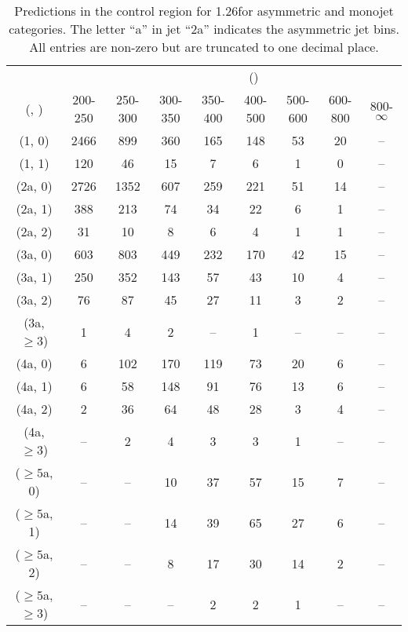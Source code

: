 \begin{table}[h!]
\tiny
\centering
\caption{Predictions in the \mj control region for 1.26\ifb for asymmetric and monojet categories. The letter ``a'' in jet \eg ``2a''  indicates the asymmetric jet bins. All entries are non-zero but are truncated to one decimal place.\label{tab:predsep_data_mu_asym}}
\begin{tabular}
{ccccccccc}
	\hline\hline
&	& \multicolumn{8}{c}{\scalht (\gev)} \\ 
	 (\njet,  \nb) & 200-250 & 250-300 & 300-350 & 350-400 & 400-500 & 500-600 & 600-800 & 800-$\infty$ \\ [0.8ex] 
\hline
	(1, 0) & 2466 & 899 & 360 & 165 & 148 & 53 & 20 & -- \\[0.5ex] 
	(1, 1) & 120 & 46 & 15 & 7 & 6 & 1 & 0 & -- \\[0.5ex] 
	(2a, 0) & 2726 & 1352 & 607 & 259 & 221 & 51 & 14 & -- \\[0.5ex] 
	(2a, 1) & 388 & 213 & 74 & 34 & 22 & 6 & 1 & -- \\[0.5ex] 
	(2a, 2) & 31 & 10 & 8 & 6 & 4 & 1 & 1 & -- \\[0.5ex] 
	(3a, 0) & 603 & 803 & 449 & 232 & 170 & 42 & 15 & -- \\[0.5ex] 
	(3a, 1) & 250 & 352 & 143 & 57 & 43 & 10 & 4 & -- \\[0.5ex] 
	(3a, 2) & 76 & 87 & 45 & 27 & 11 & 3 & 2 & -- \\[0.5ex] 
	(3a, $\ge3$) & 1 & 4 & 2 & -- & 1 & -- & -- & -- \\[0.5ex] 
	(4a, 0) & 6 & 102 & 170 & 119 & 73 & 20 & 6 & -- \\[0.5ex] 
	(4a, 1) & 6 & 58 & 148 & 91 & 76 & 13 & 6 & -- \\[0.5ex] 
	(4a, 2) & 2 & 36 & 64 & 48 & 28 & 3 & 4 & -- \\[0.5ex] 
	(4a, $\ge3$) & -- & 2 & 4 & 3 & 3 & 1 & -- & -- \\[0.5ex] 
	($\ge5$a, 0) & -- & -- & 10 & 37 & 57 & 15 & 7 & -- \\[0.5ex] 
	($\ge5$a, 1) & -- & -- & 14 & 39 & 65 & 27 & 6 & -- \\[0.5ex] 
	($\ge5$a, 2) & -- & -- & 8 & 17 & 30 & 14 & 2 & -- \\[0.5ex] 
	($\ge5$a, $\ge3$) & -- & -- & -- & 2 & 2 & 1 & -- & -- \\[0.5ex] 
	\hline
	\hline
\end{tabular}
\end{table}

